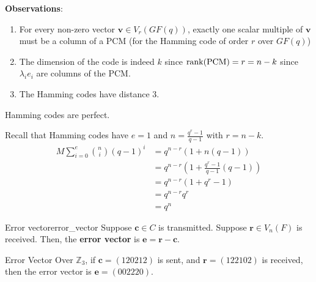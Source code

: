 \textbf{Observations}:
\begin{enumerate}[label=(\roman*)]
    \item For every non-zero vector $ \symbf{v}\in V_r(GF(q)) $, exactly one scalar multiple of $ \symbf{v} $
          must be a column of a PCM (for the Hamming code of order $ r $ over $ GF(q) $)
    \item The dimension of the code is indeed $ k $ since $ \operatorname{rank}(\text{PCM})=r=n-k $
          since $ \lambda_i e_i $ are columns of the PCM\@.
    \item The Hamming codes have distance 3.
\end{enumerate}

\begin{Theorem}{}{}
    Hamming codes are perfect.
\end{Theorem}

\begin{Proof}{}{}
    Recall that Hamming codes have $ e=1 $ and $ n=\frac{q^r-1}{q-1} $ with $ r=n-k $.
    \begin{align*}
        M \sum\limits_{i=0}^{e} \binom{n}{i}(q-1)^i
         & =q^{n-r}(1+n(q-1))                               \\
         & =q^{n-r}\left( 1+\frac{q^r-1}{q-1} (q-1) \right) \\
         & = q^{n-r}(1+q^r-1)                               \\
         & =q^{n-r}q^r                                      \\
         & =q^n
    \end{align*}
\end{Proof}

\begin{Definition}{Error vector}{error_vector}
    Suppose $ \symbf{c}\in C $ is transmitted. Suppose $ \symbf{r}\in V_n(F) $ is received.
    Then, the \textbf{error vector} is $ \symbf{e}=\symbf{r}-\symbf{c} $.
\end{Definition}

\begin{Example}{Error Vector}{}
    Over $ \mathbb{Z}_3 $, if $ \symbf{c}=(120212) $ is sent, and $ \symbf{r}=(122102) $ is received, then
    the error vector is $ \symbf{e}=(002220) $.
\end{Example}
